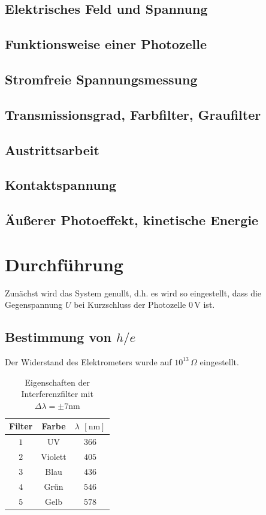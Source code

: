 \documentclass[12pt,a4paper]{scrartcl}
\numberwithin{equation}{section} %
\begin{document}
\subsection{Elektrisches Feld und Spannung}
\subsection{Funktionsweise einer Photozelle}
\subsection{Stromfreie Spannungsmessung}
\subsection{Transmissionsgrad, Farbfilter, Graufilter}
\subsection{Austrittsarbeit}
\subsection{Kontaktspannung}
\subsection{Äußerer Photoeffekt, kinetische Energie}

\clearpage
\hypertarget{durchfuxfchrung}{%
\section{Durchführung}\label{durchfuxfchrung}}
Zunächst wird das System genullt, d.h. es wird so eingestellt, dass die Gegenspannung $U$ bei Kurzschluss der Photozelle $0\mathrm{\,V}$ ist.

\subsection{Bestimmung von $h/e$}
Der Widerstand des Elektrometers wurde auf $10^{13}\,\Omega$ eingestellt.

\begin{table}[h!]
	\centering
	\begin{tabular}{c|c|c}
		Filter & Farbe & $\lambda$ $[\mathrm{nm}]$ \\
		\hline
		$1$ & UV & $366$ \\
		$2$ & Violett & $405$ \\
		$3$ & Blau & $436$ \\
		$4$ & Grün & $546$ \\
		$5$ & Gelb & $578$ \\
	\end{tabular}
	\caption{Eigenschaften der Interferenzfilter mit $\Delta \lambda = \pm 7\mathrm{nm}$}
	\label{tab:Interferenzfilter}
\end{table}
\end{document}

